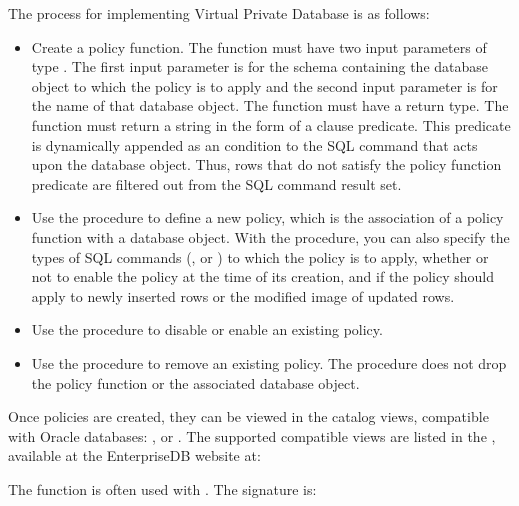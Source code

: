 \documentclass[letterpaper,10pt,english,openany,oneside]{sphinxmanual}
\begin{document}
The process for implementing Virtual Private Database is as follows:
\begin{itemize}
\item {} 
Create a policy function. The function must have two input parameters
of type . The first input parameter is for the schema
containing the database object to which the policy is to apply and
the second input parameter is for the name of that database object.
The function must have a  return type. The function must
return a string in the form of a  clause predicate. This
predicate is dynamically appended as an  condition to the SQL
command that acts upon the database object. Thus, rows that do not
satisfy the policy function predicate are filtered out from the SQL
command result set.

\item {} 
Use the  procedure to define a new policy, which is the
association of a policy function with a database object. With the
 procedure, you can also specify the types of SQL commands
(, or ) to which the policy is to apply,
whether or not to enable the policy at the time of its creation, and
if the policy should apply to newly inserted rows or the modified
image of updated rows.

\item {} 
Use the  procedure to disable or enable an existing
policy.

\item {} 
Use the  procedure to remove an existing policy. The
 procedure does not drop the policy function or the
associated database object.

\end{itemize}

Once policies are created, they can be viewed in the catalog views,
compatible with Oracle databases: , or
. The supported compatible views are listed in the
,
available at the EnterpriseDB website at:
\begin{quote}

\end{quote}

The  function is often used with . The signature
is:
\begin{quote}

\end{quote}
\end{document}
